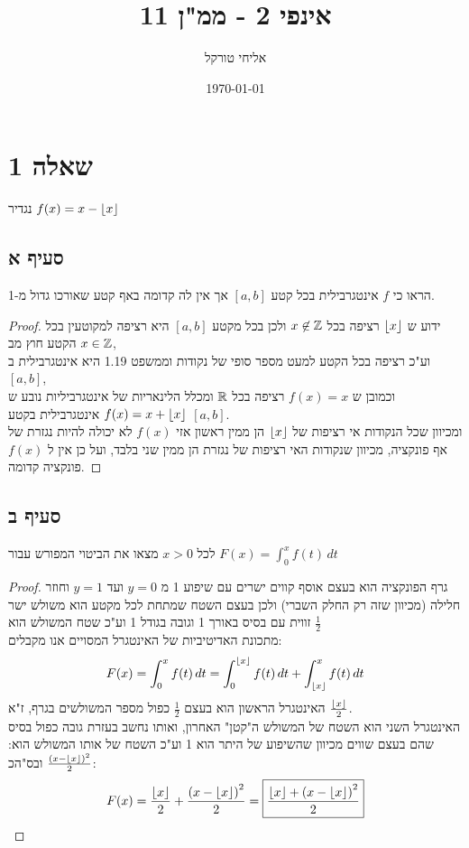 \documentclass{article}
\title{אינפי 2 - ממ"ן 11}
\author{אליחי טורקל \ID}
\date\today
\begin{document}
	\maketitle %

	\section*{שאלה 1}
	נגדיר $f(x) = x - \lfloor x \rfloor$
	\subsection*{סעיף א}
	הראו כי $f$ אינטגרבילית בכל קטע $[a,b]$ אך אין לה קדומה באף קטע שאורכו גדול מ-1.
	\begin{proof}
		ידוע ש $\lfloor x \rfloor$ רציפה בכל $x \not \in \mathbb{Z}$ ולכן בכל מקטע $[a,b]$ היא רציפה למקוטעין בכל הקטע חוץ מב $x \in \mathbb{Z}$, \\
		וע"כ רציפה בכל הקטע למעט מספר סופי של נקודות וממשפט 1.19 היא אינטגרבילית ב $[a,b]$, \\
		 וכמובן ש $f(x) = x$ רציפה בכל $\mathbb{R}$ ומכלל הלינאריות של אינטגרביליות נובע ש $f(x) = x + \lfloor x \rfloor$ אינטגרבילית בקטע $[a,b]$. \\
		 ומכיוון שכל הנקודות אי רציפות של $\lfloor x \rfloor$ הן ממין ראשון אזי $f(x)$ לא יכולה להיות נגזרת של אף פונקציה, מכיוון שנקודות האי רציפות של נגזרת הן ממין שני בלבד, ועל כן אין ל $f(x)$ פונקציה קדומה.
	\end{proof}

	\subsection*{סעיף ב}
	לכל $x > 0$ מצאו את הביטוי המפורש עבור $F(x) = \int_0^x f(t) \,dt$
	\begin{proof}
		גרף הפונקציה הוא בעצם אוסף קווים ישרים עם שיפוע 1 מ $y = 0$ ועד $y = 1$ וחוזר חלילה (מכיוון שזה רק החלק השברי)
		ולכן בעצם השטח שמתחת לכל מקטע הוא משולש ישר זווית עם בסיס באורך 1 וגובה בגודל 1 וע"כ שטח המשולש הוא $\frac{1}{2}$ \\
		מתכונת האדיטיביות של האינטגרל המסויים אנו מקבלים:
		\[
			F(x) = \int_0^x f(t) \,dt = \int_0^{\lfloor x \rfloor} f(t) \,dt + \int_{\lfloor x \rfloor}^x f(t) \, dt
		\]
		האינטגרל הראשון הוא בעצם $\frac{1}{2}$ כפול מספר המשולשים בגרף, ז"א $\frac{\lfloor x \rfloor}{2}$. \\
		האינטגרל השני הוא השטח של המשולש ה"קטן" האחרון, ואותו נחשב בעזרת גובה כפול בסיס שהם בעצם שווים מכיוון שהשיפוע של היתר הוא 1 וע"כ השטח של אותו המשולש הוא: $\frac{\left(x - \lfloor x \rfloor\right)^2}{2}$ ובס"הכ:
		\[
			F(x) = \frac{\lfloor x \rfloor}{2} + \frac{\left(x - \lfloor x \rfloor\right)^2}{2}
			= \boxed{\frac{\lfloor x \rfloor + \left(x - \lfloor x \rfloor\right)^2}{2}}
		\]
	\end{proof}
\end{document}
